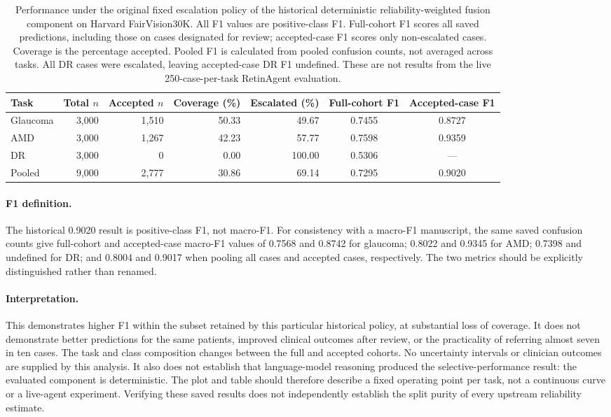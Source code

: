\begin{table}[t]
\centering
\caption{Performance under the original fixed escalation policy of the
historical deterministic reliability-weighted fusion component on Harvard
FairVision30K. All F1 values are positive-class F1. Full-cohort F1 scores all
saved predictions, including those on cases designated for review;
accepted-case F1 scores only non-escalated cases. Coverage is the percentage
accepted. Pooled F1 is calculated from pooled confusion counts, not averaged
across tasks. All DR cases were escalated, leaving accepted-case DR F1
undefined. These are not results from the live 250-case-per-task RetinAgent
evaluation.}
\label{tab:fairvision_fixed_escalation}
\small
\begin{tabular}{@{}lrrrrcc@{}}
\toprule
Task & Total $n$ & Accepted $n$ & Coverage (\%) & Escalated (\%) &
Full-cohort F1 & Accepted-case F1 \\
\midrule
Glaucoma & 3,000 & 1,510 & 50.33 &  49.67 & 0.7455 & 0.8727 \\
AMD      & 3,000 & 1,267 & 42.23 &  57.77 & 0.7598 & 0.9359 \\
DR       & 3,000 &     0 &  0.00 & 100.00 & 0.5306 & ---    \\
\midrule
Pooled   & 9,000 & 2,777 & 30.86 &  69.14 & 0.7295 & 0.9020 \\
\bottomrule
\end{tabular}
\end{table}

\paragraph{F1 definition.}
The historical 0.9020 result is positive-class F1, not macro-F1. For
consistency with a macro-F1 manuscript, the same saved confusion counts give
full-cohort and accepted-case macro-F1 values of 0.7568 and 0.8742 for
glaucoma; 0.8022 and 0.9345 for AMD; 0.7398 and undefined for DR; and 0.8004
and 0.9017 when pooling all cases and accepted cases, respectively.
The two metrics should be explicitly distinguished rather than renamed.

\paragraph{Interpretation.}
This demonstrates higher F1 within the subset retained by this particular
historical policy, at substantial loss of coverage. It does not demonstrate
better predictions for the same patients, improved clinical outcomes after
review, or the practicality of referring almost seven in ten cases. The
task and class composition changes between the full and accepted cohorts.
No uncertainty intervals or clinician outcomes are supplied by this
analysis. It also does not establish that language-model reasoning produced
the selective-performance result: the evaluated component is deterministic.
The plot and table should therefore describe a fixed operating point per
task, not a continuous curve or a live-agent experiment. Verifying these
saved results does not independently establish the split purity of every
upstream reliability estimate.
